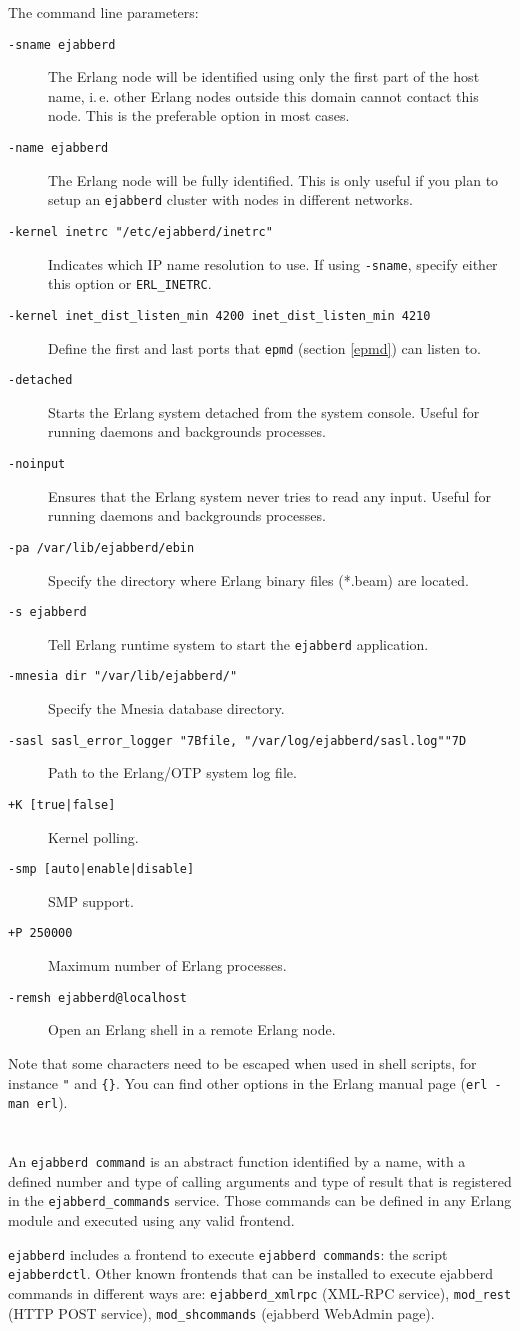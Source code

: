 \documentclass[a4paper,10pt]{book}
\newcommand{\makesection}[2]{ \aname{#1}{} \section{\ahrefloc{#1}{#2}} \label{#1} }
\newcommand{\bracehack}{\def\{{\char"7B}\def\}{\char"7D}}
\newcommand{\titem}[1]{\item[\bracehack\texttt{#1}]}
\newcommand{\term}[1]{\texttt{#1}}
\newcommand{\shell}[1]{\texttt{#1}}
\newcommand{\ejabberd}{\texttt{ejabberd}}
\begin{document}
The command line parameters:
\begin{description}
  \titem{-sname ejabberd}
	The Erlang node will be identified using only the first part
	of the host name, i.\,e. other Erlang nodes outside this domain cannot contact
	this node. This is the preferable option in most cases.
  \titem{-name ejabberd}
	The Erlang node will be fully identified.
    This is only useful if you plan to setup an \ejabberd{} cluster with nodes in different networks.
  \titem{-kernel inetrc "/etc/ejabberd/inetrc"}
	Indicates which IP name resolution to use.
	If using \term{-sname}, specify either this option or \term{ERL\_INETRC}.
  \titem{-kernel inet\_dist\_listen\_min 4200 inet\_dist\_listen\_min 4210}
	Define the first and last ports that \term{epmd} (section \ref{epmd}) can listen to.
  \titem{-detached}
        Starts the Erlang system detached from the system console.
	Useful for running daemons and backgrounds processes.
  \titem{-noinput}
	Ensures that the Erlang system never tries to read any input.
	Useful for running daemons and backgrounds processes.
  \titem{-pa /var/lib/ejabberd/ebin}
	Specify the directory where Erlang binary files (*.beam) are located.
  \titem{-s ejabberd}
	Tell Erlang runtime system to start the \ejabberd{} application.
  \titem{-mnesia dir "/var/lib/ejabberd/"}
	Specify the Mnesia database directory.
  \titem{-sasl sasl\_error\_logger \{file, "/var/log/ejabberd/sasl.log"\}}
	Path to the Erlang/OTP system log file.
  \titem{+K [true|false]}
	Kernel polling.
  \titem{-smp [auto|enable|disable]}
	SMP support.
  \titem{+P 250000}
	Maximum number of Erlang processes.
  \titem{-remsh ejabberd@localhost}
	Open an Erlang shell in a remote Erlang node.
\end{description}
Note that some characters need to be escaped when used in shell scripts, for instance \verb|"| and \verb|{}|.
You can find other options in the Erlang manual page (\shell{erl -man erl}).

\makesection{eja-commands}{\ejabberd{} Commands}

An \term{ejabberd command} is an abstract function identified by a name,
with a defined number and type of calling arguments and type of result
that is registered in the \term{ejabberd\_commands} service.
Those commands can be defined in any Erlang module and executed using any valid frontend.

\ejabberd{} includes a frontend to execute \term{ejabberd commands}: the script \term{ejabberdctl}.
Other known frontends that can be installed to execute ejabberd commands in different ways are:
\term{ejabberd\_xmlrpc} (XML-RPC service),
\term{mod\_rest} (HTTP POST service),
\term{mod\_shcommands} (ejabberd WebAdmin page).
\end{document}

